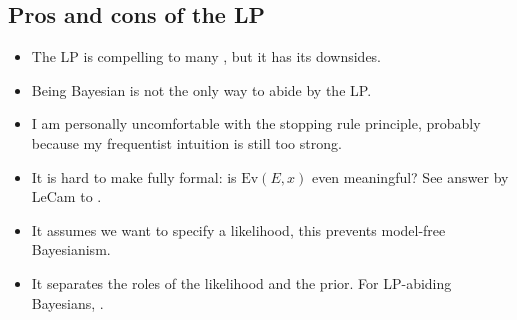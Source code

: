 \subsection{Pros and cons of the LP}
\begin{itemize}
  \item The LP is compelling to many \citep{BeWo88}, but it has its downsides.
  \item Being Bayesian is not the only way to abide by the LP.
  \item I am personally uncomfortable with the stopping rule principle, probably because my frequentist intuition is still too strong.
  \item It is hard to make fully formal: is $\text{Ev}(E,x)$ even meaningful? See answer by LeCam to \citep{BeWo88}.
  \item It assumes we want to specify a likelihood, this prevents model-free Bayesianism.
  \item It separates the roles of the likelihood and the prior. For LP-abiding Bayesians, .
\end{itemize}



